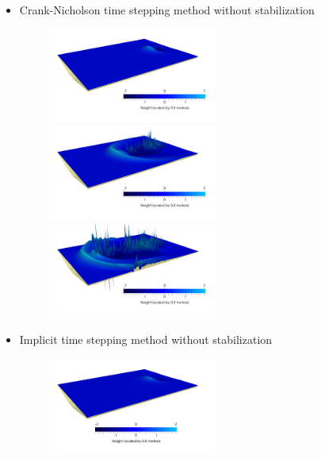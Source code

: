 \documentclass[11pt,a4paper]{article}
\begin{document}
\begin{itemize}
	\item Crank-Nicholson time stepping method without stabilization
	\begin{figure}[!h]
		\begin{minipage}[t]{0.3\linewidth}
			\centering
			\includegraphics[width=5.5cm]{CNNoStabilized150.png}
		\end{minipage}
		\begin{minipage}[t]{0.3\linewidth}
			\centering
			\includegraphics[width=5.5cm]{CNNoStabilized300.png}
		\end{minipage}
		\begin{minipage}[t]{0.3\linewidth}
			\centering
			\includegraphics[width=5.5cm]{CNNoStabilized400.png}
		\end{minipage}
	\end{figure}
	\item Implicit time stepping method without stabilization
	\begin{figure}[!h]
		\begin{minipage}[t]{0.3\linewidth}
			\centering
			\includegraphics[width=5.5cm]{ImplicitNoStabilized150.png}
		\end{minipage}

\end{figure}
\end{itemize}
\end{document}
